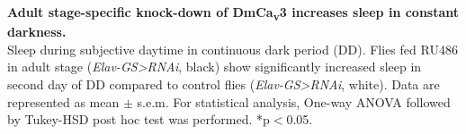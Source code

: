 \label{fig:S}
\textbf{Adult stage-specific knock-down of DmCa\textsubscript{v}3 increases sleep in constant darkness.}
\\
Sleep during subjective daytime in continuous dark period (DD). 
Flies fed RU486 in adult stage (\emph{Elav-GS\textgreater{}RNAi}, black) show significantly increased sleep in second day of DD compared to control flies (\emph{Elav-GS\textgreater{}RNAi}, white).
Data are represented as mean $\pm$ s.e.m.
For statistical analysis, One-way ANOVA followed by Tukey-HSD post hoc test was performed.
*p$<$0.05.
  


  
  
  
  
  
  
  